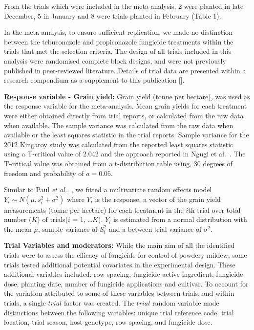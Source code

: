 \documentclass[agronomy,article,submit,moreauthors,pdftex]{mdpi}
\begin{document}
From the trials which were included in the meta-analysis, 2 were planted
in late December, 5 in January and 8 were trials planted in February
(Table 1).

In the meta-analysis, to ensure sufficient replication, we made no
distinction between the tebuconazole and propiconazole fungicide
treatments within the trials that met the selection criteria. The design
of all trials included in this analysis were randomised complete block
designs, and were not previously published in peer-reviewed literature.
Details of trial data are presented within a research compendium as a
supplement to this publication {[}{]}.

\textbf{Response variable - Grain yield: } Grain yield (tonne per
hectare), was used as the response variable for the meta-analysis. Mean
grain yields for each treatment were either obtained directly from trial
reports, or calculated from the raw data when available. The sample
variance was calculated from the raw data when available or the least
squares statistic in the trial reports. Sample variance for the 2012
Kingaroy study was calculated from the reported least squares statistic
using a T-critical value of 2.042 and the approach reported in Ngugi et
al.~\citeyearpar{Ngugi2011}. The T-critical value was obtained from a
t-distribution table using, 30 degrees of freedom and probability of
\(a = 0.05\).

Similar to Paul \emph{et al..} \citeyearpar{Paul2007}, we fitted a
multivariate random effects model \(Y_i \sim N(\mu,s_i^2 + \sigma^2)\)
where \(Y_i\) is the response, a vector of the grain yield measurements
(tonne per hectare) for each treatment in the \(i\)th trial over total
number (\(K\)) of trials(\(i\) = 1, \ldots{}\(K\)). \(Y_i\) is estimated
from a normal distribution with the mean \(\mu\), sample variance of
\(S_i^2\) and a between trial variance of \(\sigma^2\).

\textbf{Trial Variables and moderators: } While the main aim of all the
identified trials were to assess the efficacy of fungicide for control
of powdery mildew, some trials tested additional potential covariates in
the experimental design. These additional variables included: row
spacing, fungicide active ingredient, fungicide dose, planting date,
number of fungicide applications and cultivar. To account for the
variation attributed to some of these variables between trials, and
within trials, a single \(trial\) factor was created. The \(trial\)
random variable made distinctions between the following variables:
unique trial reference code, trial location, trial season, host
genotype, row spacing, and fungicide dose.
\end{document}
